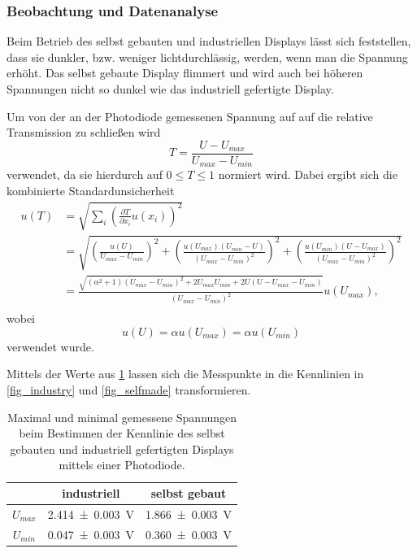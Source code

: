 \documentclass[
	a4paper,
	12pt,
	pagesize,
	ngerman
]{scrartcl}
\begin{document}
	\subsubsection{Beobachtung und Datenanalyse}
	Beim Betrieb des selbst gebauten und industriellen Displays lässt sich feststellen, dass sie dunkler, bzw. weniger lichtdurchlässig, werden, wenn man die Spannung erhöht.
	Das selbst gebaute Display flimmert und wird auch bei höheren Spannungen nicht so dunkel wie das industriell gefertigte Display.

	Um von der an der Photodiode gemessenen Spannung auf auf die relative Transmission zu schließen wird %
	\begin{equation}
			T = \frac{U-U_{max}}{U_{max}-U_{min}}
	\end{equation}
	verwendet, da sie hierdurch auf $0\leq T \leq 1$ normiert wird. Dabei ergibt sich die kombinierte Standardunsicherheit
	\begin{align*}
		u(T) &= \sqrt{\sum_{i}\left(\frac{\partial T}{\partial x_i} u(x_i)\right)^2}\\
		&= \sqrt{\left(\frac{u(U)}{U_{max}-U_{min}}\right)^2+\left(\frac{u(U_{max})(U_{min}-U)}{(U_{max}-U_{min})^2}\right)^2+\left(\frac{u(U_{min})(U-U_{max})}{(U_{max}-U_{min})^2}\right)^2} \\
		&=	\frac{\sqrt{ (\alpha^2+1) (U_{max}-U_{min})^2+2U_{max}U_{min}+2U(U-U_{max}-U_{min})}}{(U_{max}-U_{min})^2} u(U_{max}), \\
	\end{align*}
	wobei
	\begin{equation*}
			u(U)=\alpha u(U_{max})=\alpha u(U_{min})
	\end{equation*}
	verwendet wurde.

	Mittels der Werte aus \cref{tb_maxmin} lassen sich die Messpunkte in die Kennlinien in \cref{fig_industry} und \cref{fig_selfmade} transformieren.
\begin{table}[H]
		\centering
		\begin{tabular}{ c | c | c }
			 & industriell & selbst gebaut \\ \hline
			$U_{max}$ & \SI{2.414+-0.003}{V} & \SI{1.866+-0.003}{V} \\
			$U_{min}$ & \SI{0.047+-0.003}{V} & \SI{0.360+-0.003}{V} \\
		\end{tabular}
		\caption{Maximal und minimal gemessene Spannungen beim Bestimmen der Kennlinie des selbst gebauten und industriell gefertigten Displays mittels einer Photodiode.}
		\label{tb_maxmin}
\end{table}
\end{document}
